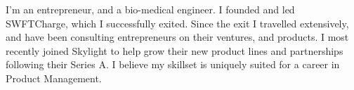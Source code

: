 

\begin{cvparagraph}
I’m an entrepreneur, and a bio-medical engineer. I founded and led SWFTCharge, which I successfully exited. Since the exit I travelled extensively, and have been consulting entrepreneurs on their ventures, and products. I most recently joined Skylight to help grow their new product lines and partnerships following their Series A. I believe my skillset is uniquely suited for a career in Product Management.
\end{cvparagraph}
